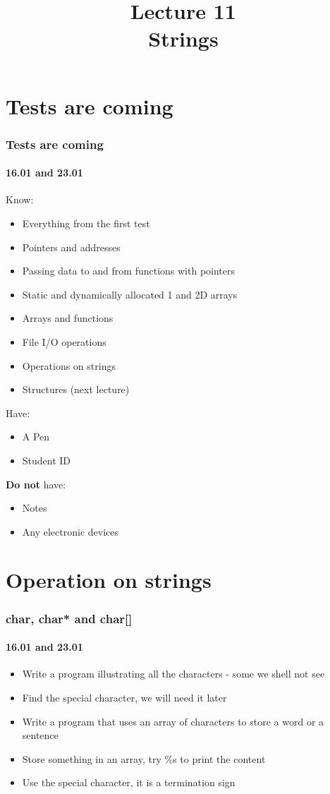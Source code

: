 \documentclass[10pt]{beamer}
\title{Lecture 11\\Strings}
\date{}
\begin{document}
\frame{
    \titlepage
}

\section{Tests are coming}

\begin{frame}[fragile]
  \frametitle{Tests are coming}
  \framesubtitle{16.01 and 23.01}  
Know:
\begin{itemize}
  \item Everything from the first test
  \item Pointers and addresses
  \item Passing data to and from functions with pointers
  \item Static and dynamically allocated 1 and 2D arrays
  \item Arrays and functions
  \item File I/O operations
  \item Operations on strings
  \item Structures (next lecture)
\end{itemize}
Have:
  \begin{itemize}
    \item A Pen
    \item Student ID
  \end{itemize}
  \textbf{Do not} have:
  \begin{itemize}
    \item Notes
    \item Any electronic devices
  \end{itemize}

\end{frame}

\section{Operation on strings}

\begin{frame}[fragile]
  \frametitle{char, char* and char[]}
  \framesubtitle{16.01 and 23.01}  
\centering
  \begin{itemize}
    \item Write a program illustrating all the characters - some we shell not see
    \item Find the special character, we will need it later
    \item Write a program that uses an array of characters to store a word or a sentence
    \item Store something in an array, try \%s to print the content
    \item Use the special character, it is a termination sign
  \end{itemize}

\end{frame}
\end{document}
